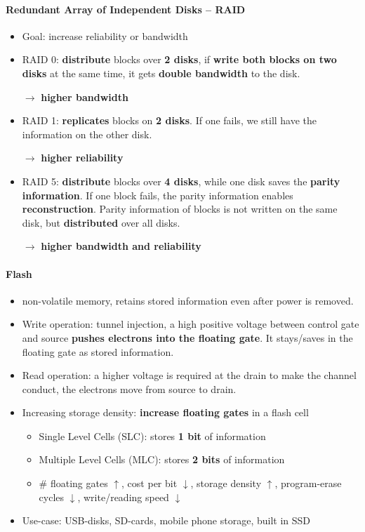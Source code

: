 \paragraph{Redundant Array of Independent Disks -- RAID}
\begin{itemize}
	\item Goal: increase reliability or bandwidth
	\item RAID 0: \textbf{distribute} blocks over \textbf{2 disks}, if \textbf{write both blocks on two disks} at the same time, it gets \textbf{double bandwidth} to the disk.
	
	$\rightarrow$ \textbf{higher bandwidth}
	\item RAID 1: \textbf{replicates} blocks on \textbf{2 disks}. If one fails, we still have the information on the other disk. 
	
	$\rightarrow$ \textbf{higher reliability}
	\item RAID 5: \textbf{distribute} blocks over \textbf{4 disks}, while one disk saves the \textbf{parity information}. If one block fails, the parity information enables \textbf{reconstruction}. Parity information of blocks is not written on the same disk, but \textbf{distributed} over all disks.
	
	$\rightarrow$ \textbf{higher bandwidth and reliability}
\end{itemize}
\paragraph{Flash}
\begin{itemize}
	\item non-volatile memory, retains stored information even after power is removed.
	\item Write operation: tunnel injection, a high positive voltage between control gate and source \textbf{pushes electrons into the floating gate}. It stays/saves in the floating gate as stored information. 
	\item Read operation: a higher voltage is required at the drain to make the channel conduct, the electrons move from source to drain.
	\item Increasing storage density: \textbf{increase floating gates} in a flash cell
	\begin{itemize}
		\item Single Level Cells (SLC): stores \textbf{1 bit} of information
		\item Multiple Level Cells (MLC): stores \textbf{2 bits} of information
		\item \# floating gates $\uparrow$, cost per bit $\downarrow$, storage density $\uparrow$, program-erase cycles $\downarrow$, write/reading speed $\downarrow$
	\end{itemize}
	
	\item Use-case: USB-disks, SD-cards, mobile phone storage, built in SSD
\end{itemize}

